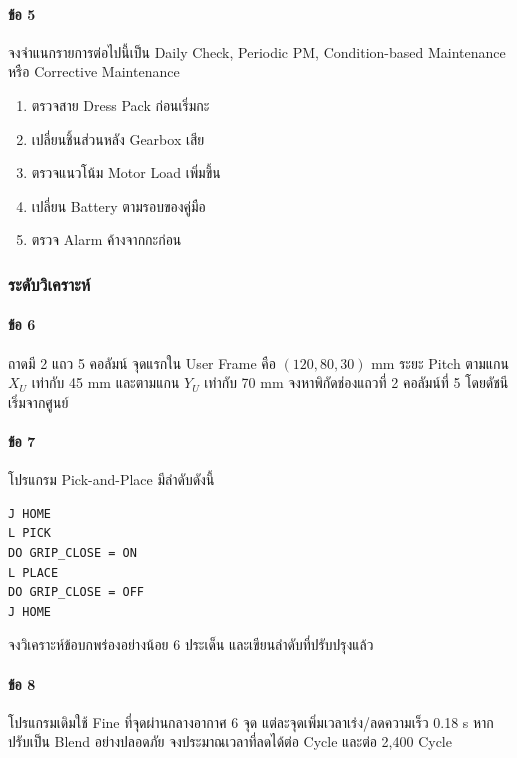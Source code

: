 \paragraph{ข้อ 5}

จงจำแนกรายการต่อไปนี้เป็น Daily Check, Periodic PM, Condition-based Maintenance หรือ Corrective Maintenance

\begin{enumerate}
    \item ตรวจสาย Dress Pack ก่อนเริ่มกะ
    \item เปลี่ยนชิ้นส่วนหลัง Gearbox เสีย
    \item ตรวจแนวโน้ม Motor Load เพิ่มขึ้น
    \item เปลี่ยน Battery ตามรอบของคู่มือ
    \item ตรวจ Alarm ค้างจากกะก่อน
\end{enumerate}

\subsubsection{ระดับวิเคราะห์}

\paragraph{ข้อ 6}

ถาดมี 2 แถว 5 คอลัมน์ จุดแรกใน User Frame คือ $(120,80,30)$ mm ระยะ Pitch ตามแกน $X_U$ เท่ากับ 45 mm และตามแกน $Y_U$ เท่ากับ 70 mm จงหาพิกัดช่องแถวที่ 2 คอลัมน์ที่ 5 โดยดัชนีเริ่มจากศูนย์

\paragraph{ข้อ 7}

โปรแกรม Pick-and-Place มีลำดับดังนี้

\begin{verbatim}
J HOME
L PICK
DO GRIP_CLOSE = ON
L PLACE
DO GRIP_CLOSE = OFF
J HOME
\end{verbatim}

จงวิเคราะห์ข้อบกพร่องอย่างน้อย 6 ประเด็น และเขียนลำดับที่ปรับปรุงแล้ว

\paragraph{ข้อ 8}

โปรแกรมเดิมใช้ Fine ที่จุดผ่านกลางอากาศ 6 จุด แต่ละจุดเพิ่มเวลาเร่ง/ลดความเร็ว 0.18 s หากปรับเป็น Blend อย่างปลอดภัย จงประมาณเวลาที่ลดได้ต่อ Cycle และต่อ 2,400 Cycle

